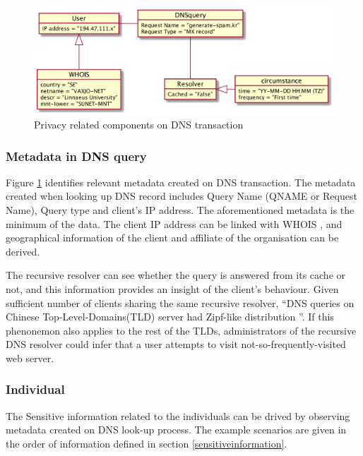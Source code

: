 \begin{figure}[ht!]
    \begin{center}
        \includegraphics*[width=\columnwidth]{img/privacyobject}
    \end{center}
    \caption{Privacy related components on DNS transaction}
    \label{privacyobject}
\end{figure}

\subsubsection{Metadata in DNS query}\label{dnsmetadata}
Figure \ref{privacyobject} identifies relevant metadata created on DNS transaction.
The metadata created when looking up DNS record includes Query Name (QNAME or Request Name), Query type and client's IP address.
The aforementioned metadata is the minimum of the data. The client IP address can be linked with WHOIS \cite{whois-icann}, and geographical information of the client and affiliate of the organisation can be derived.

The recursive resolver can see whether the query is answered from its cache or not, and this information provides an insight of the client's behaviour.
Given sufficient number of clients sharing the same recursive resolver, ``DNS queries on Chinese Top-Level-Domains(TLD) server had Zipf-like distribution \cite{wang2013analysis}''. If this phenonemon also applies to the rest of the TLDs, administrators of the recursive DNS resolver could infer that a user attempts to visit not-so-frequently-visited web server.

\subsubsection{Individual}
The Sensitive information related to the individuals can be drived by observing metadata created on DNS look-up process. The example scenarios are given in the order of information defined in section \ref{sensitiveinformation}.

